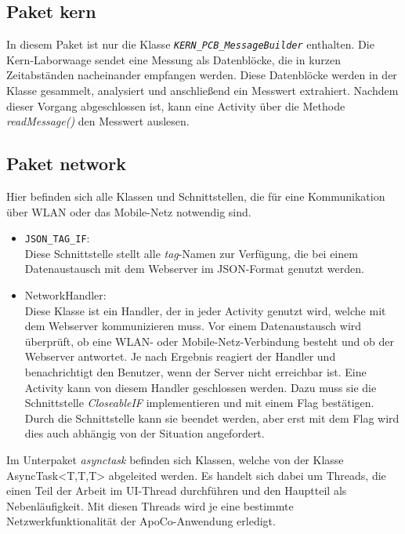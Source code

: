 \subsection*{Paket kern}

In diesem Paket ist nur die Klasse \emph{\texttt{KERN\_PCB\_MessageBuilder}} enthalten.
Die Kern-Laborwaage sendet eine Messung als Datenbl\"ocke, die in kurzen Zeitabst\"anden nacheinander empfangen werden.
Diese Datenbl\"ocke werden in der Klasse gesammelt, analysiert und anschlie\ss{}end ein Messwert extrahiert.
Nachdem dieser Vorgang abgeschlossen ist, kann eine Activity \"uber die Methode \emph{readMessage()} den Messwert auslesen.\\

\subsection*{Paket network}

Hier befinden sich alle Klassen und Schnittstellen, die f\"ur eine Kommunikation \"uber WLAN oder das Mobile-Netz 
notwendig sind.
\begin{itemize}
 \item \texttt{JSON\_TAG\_IF}:\\
 Diese Schnittstelle stellt alle \emph{tag}-Namen zur Verf\"ugung, 
 die bei einem Datenaustausch mit dem Webserver im JSON-Format genutzt werden.
 
 \item NetworkHandler:\\
 Diese Klasse ist ein Handler, der in jeder Activity genutzt wird, welche mit dem Webserver kommunizieren muss.
 Vor einem Datenaustausch wird \"uberpr\"uft, ob eine WLAN- oder Mobile-Netz-Verbindung besteht und ob der Webserver antwortet.
 Je nach Ergebnis reagiert der Handler und benachrichtigt den Benutzer, wenn der Server nicht erreichbar ist.
 Eine Activity kann von diesem Handler geschlossen werden.
 Dazu muss sie die Schnittstelle \emph{CloseableIF} implementieren und mit einem Flag best\"atigen.
 Durch die Schnittstelle kann sie beendet werden, aber erst mit dem Flag wird dies auch abh\"angig von der Situation angefordert.
\end{itemize}

Im Unterpaket \emph{asynctask} befinden sich Klassen, welche von der Klasse AsyncTask<T,T,T> abgeleited werden.
Es handelt sich dabei um Threads, die einen Teil der Arbeit im UI-Thread durchf\"uhren und den Hauptteil als Nebenl\"aufigkeit.
Mit diesen Threads wird je eine bestimmte Netzwerkfunktionalit\"at der ApoCo-Anwendung erledigt.\\

